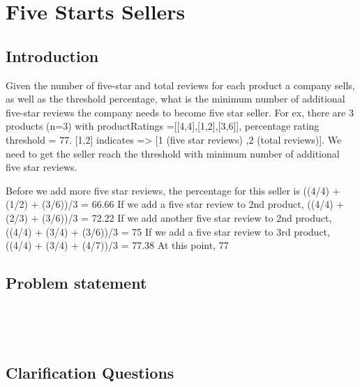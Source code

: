 %

\chapter{Five Starts Sellers}
\label{ch:five_starts_seller}
\section*{Introduction}
Given the number of five-star and total reviews for each product a company sells,
as well as the threshold percentage, 
what is the minimum number of additional five-star reviews the company needs to become five star seller.
For ex, there are 3 products (n=3) with productRatings =[[4,4],[1,2],[3,6]], percentage rating threshold = 77.
[1,2] indicates => [1 (five star reviews) ,2 (total reviews)].
We need to get the seller reach the threshold with minimum number of additional five star reviews.

Before we add more five star reviews, the percentage for this seller is ((4/4) + (1/2) + (3/6))/3 = 66.66%
If we add a five star review to 2nd product, ((4/4) + (2/3) + (3/6))/3 = 72.22%
If we add another five star review to 2nd product, ((4/4) + (3/4) + (3/6))/3 = 75%
If we add a five star review to 3rd product, ((4/4) + (3/4) + (4/7))/3 = 77.38%
At this point, 77%


\section{Problem statement}
\begin{exercise}

\end{exercise}


\begin{example}
	\hfill \
	
\end{example}

\begin{example}
	\hfill \
	
\end{example}

\section{Clarification Questions}




